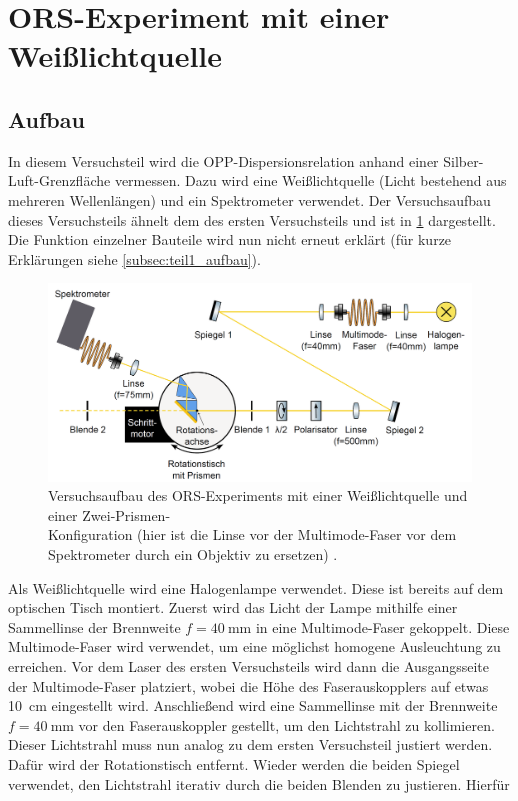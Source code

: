 \section{ORS-Experiment mit einer Weißlichtquelle}\label{sec:versuchsteil2}
\subsection{Aufbau}\label{subsec:teil2_aufbau}
In diesem Versuchsteil wird die OPP-Dispersionsrelation anhand einer Silber-Luft-Grenzfläche vermessen. Dazu wird eine Weißlichtquelle (Licht
bestehend aus mehreren Wellenlängen) und ein Spektrometer verwendet. Der Versuchsaufbau dieses Versuchsteils ähnelt dem des ersten Versuchsteils und ist
in \cref{fig:versuchsteil2_aufbau} dargestellt. Die Funktion einzelner Bauteile wird nun nicht erneut erklärt (für kurze Erklärungen siehe \cref{subsec:teil1_aufbau}).
\begin{figure}[H]
	\centering
	\includegraphics[width=0.6\linewidth]{../figs/versuchsteil2_aufbau.png}
	\caption{Versuchsaufbau des ORS-Experiments mit einer Weißlichtquelle und einer Zwei-Prismen-\\Konfiguration (hier ist die Linse vor der
    Multimode-Faser vor dem Spektrometer durch ein Objektiv zu ersetzen) \cite{skript}.}
	\label{fig:versuchsteil2_aufbau}
\end{figure} Als Weißlichtquelle wird eine Halogenlampe verwendet. Diese ist bereits auf dem optischen Tisch montiert. Zuerst wird das Licht der
Lampe mithilfe einer Sammellinse der Brennweite $f = \SI{40}{\mm}$ in eine Multimode-Faser gekoppelt. Diese Multimode-Faser wird verwendet, um eine
möglichst homogene Ausleuchtung zu erreichen. Vor dem Laser des ersten Versuchsteils wird dann die Ausgangsseite der Multimode-Faser platziert, wobei
die Höhe des Faserauskopplers auf etwas \SI{10}{\cm} eingestellt wird. Anschließend wird eine Sammellinse mit der Brennweite $f = \SI{40}{\mm}$ vor
den Faserauskoppler gestellt, um den Lichtstrahl zu kollimieren. Dieser Lichtstrahl muss nun analog zu dem ersten Versuchsteil justiert werden. Dafür
wird der Rotationstisch entfernt. Wieder werden die beiden Spiegel verwendet, den Lichtstrahl iterativ durch die beiden Blenden zu justieren. Hierfür
